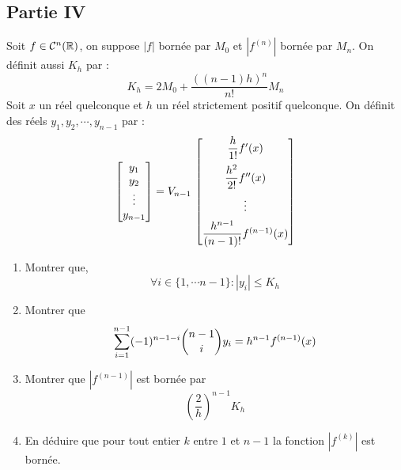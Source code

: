 \subsection*{Partie IV}
Soit $f\in \mathcal C^n(\mathbb{R})$, on suppose $|f|$ bornée par $M_0$ et $|f^{(n)}|$ bornée par $M_n$. On définit aussi $K_h$ par :
\begin{displaymath}
 K_h = 2M_0 + \dfrac{((n-1)h)^n}{n!}M_n
\end{displaymath}
Soit $x$ un réel quelconque et $h$ un réel strictement positif quelconque. On définit des réels $y_1,y_2,\cdots,y_{n-1}$ par :
\begin{displaymath}
 \begin{bmatrix}
  y_1 \\ y_2 \\ \vdots \\ y_{n-1}
 \end{bmatrix}
= V_{n-1}\,
\begin{bmatrix}
 \dfrac{h}{1!}f'(x)\vspace{5pt} \\ \dfrac{h^2}{2!}f''(x) \vspace{5pt}\\ \vdots \vspace{5pt} \\ \dfrac{h^{n-1}}{(n-1)!}f^{(n-1)}(x)
\end{bmatrix}
\end{displaymath}
\begin{enumerate}
 \item Montrer que,
\begin{displaymath}
 \forall i \in\{1,\cdots n-1\} : |y_i|\leq K_h
\end{displaymath}
\item Montrer que
\begin{displaymath}
 \sum_{i=1}^{n-1}(-1)^{n-1-i}\dbinom{n-1}{i}y_i = h^{n-1}f^{(n-1)}(x)
\end{displaymath}
\item Montrer que $|f^{(n-1)}|$ est bornée par
\begin{displaymath}
 \left( \dfrac{2}{h}\right)^{n-1}K_h
\end{displaymath}
\item En déduire que pour tout entier $k$ entre $1$ et $n-1$ la fonction $|f^{(k)}|$ est bornée.
\end{enumerate}


